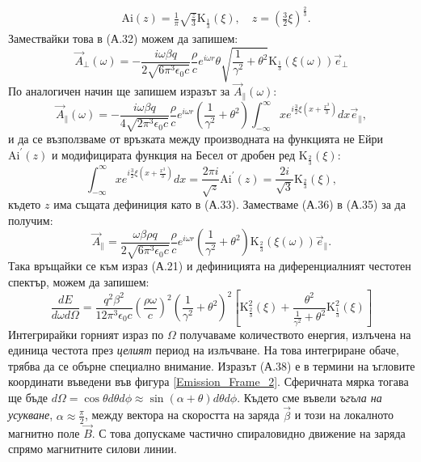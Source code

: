 \begin{appendices}
\begin{equation}
\begin{split}
	&\text{Ai}(z) = \frac{1}{\pi}\sqrt{\frac{z}{3}}\text{K}_{\frac{1}{3}}(\xi),\quad z = \left(\frac{3}{2}\xi\right)^{\frac{2}{3}}.
	\end{split}
\end{equation}
Замествайки това в (А.32) можем да запишем:
\begin{equation}
	\vec{A}_\perp(\omega) = -\frac{i\omega\beta q}{2\sqrt{6\pi^3\epsilon_0 c}}\frac{\rho}{c}e^{i\omega r}\theta \sqrt{\frac{1}{\gamma^2} + \theta^2}\text{K}_{\frac{1}{3}}(\xi(\omega))\vec{e}_\perp
\end{equation}
По аналогичен начин ще запишем изразът за $\vec{A}_\parallel(\omega)$:
\begin{equation}
	\vec{A}_\parallel(\omega) = -\frac{i\omega\beta q}{4\sqrt{2\pi^3\epsilon_0 c}}\frac{\rho}{c}e^{i\omega r}\left(\frac{1}{\gamma^2} + \theta^2\right)\int_{-\infty}^\infty x e^{i\frac{3}{2}\xi\left(x + \frac{x^3}{3}\right)}dx \vec{e}_\parallel,
\end{equation}
и да се възползваме от връзката между производната на функцията не Ейри $\text{Ai}^\prime(z)$ и модифицирата функция на Бесел от дробен ред $\text{K}_{\frac{2}{3}}(\xi)$:
\begin{equation}
	\int_{-\infty}^\infty x e^{i\frac{3}{2}\xi\left(x + \frac{x^3}{3}\right)}dx = \frac{2 \pi i}{\sqrt{z}}\text{Ai}^\prime (z) = \frac{2i}{\sqrt{3}}\text{K}_{\frac{2}{3}}(\xi),
\end{equation}
където $z$ има същата дефиниция като в (А.33). Заместваме (А.36) в (А.35) за да получим:
\begin{equation}
	\vec{A}_\parallel = \frac{\omega\beta\rho q}{2\sqrt{6\pi^3\epsilon_0 c}}\frac{\rho}{c}e^{i\omega r}\left( \frac{1}{\gamma^2} + \theta^2 \right) \text{K}_{\frac{2}{3}}(\xi(\omega))\vec{e}_\parallel.
\end{equation}
Така връщайки се към израз (А.21) и дефиницията на диференциалният честотен спектър, можем да запишем:
\begin{equation}
	\frac{dE}{d\omega d\Omega} = \frac{q^2\beta^2}{12\pi^3\epsilon_0 c}\left(\frac{\rho\omega}{c}\right)^2\left(\frac{1}{\gamma^2}+\theta^2\right)^2\left[\text{K}^2_{\frac{2}{3}}(\xi) + \frac{\theta^2}{\frac{1}{\gamma^2} + \theta^2}\text{K}^2_{\frac{1}{3}}(\xi)\right]
\end{equation}
Интегрирайки горният израз по $\Omega$ получаваме количеството енергия, излъчена на единица честота през \emph{целият} период на излъчване. На това интегриране обаче, трябва да се обърне специално внимание. Изразът (А.38) е в термини на ъгловите координати въведени във фигура \ref{Emission_Frame_2}. Сферичната мярка тогава ще бъде $d\Omega = \cos\theta d\theta d\phi \approx \sin(\alpha + \theta) d\theta d\phi $. Където сме въвели \emph{ъгъла на усукване}, $\alpha \approx \frac{\pi}{2}$, между вектора на скоростта на заряда $\vec{\beta}$ и този на локалното магнитно поле $\vec{B}$. С това допускаме частично спираловидно движение на заряда спрямо магнитните силови линии.

\end{appendices}
